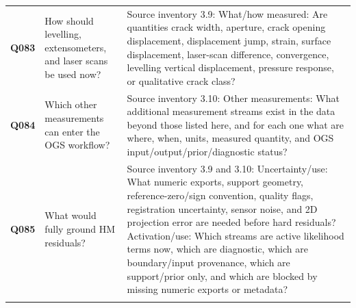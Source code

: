 \begin{longtable}{@{}L{0.10\textwidth} L{0.30\textwidth} L{0.52\textwidth}@{}}
\addlinespace[0.22em]
\textbf{Q083} & How should levelling, extensometers, and laser scans be used now? & Source inventory 3.9: What/how measured: Are quantities crack width, aperture, crack opening displacement, displacement jump, strain, surface displacement, laser-scan difference, convergence, levelling vertical displacement, pressure response, or qualitative crack class?\\
\addlinespace[0.22em]
\textbf{Q084} & Which other measurements can enter the OGS workflow? & Source inventory 3.10: Other measurements: What additional measurement streams exist in the data beyond those listed here, and for each one what are where, when, units, measured quantity, and OGS input/output/prior/diagnostic status?\\
\addlinespace[0.22em]
\textbf{Q085} & What would fully ground HM residuals? & Source inventory 3.9 and 3.10: Uncertainty/use: What numeric exports, support geometry, reference-zero/sign convention, quality flags, registration uncertainty, sensor noise, and 2D projection error are needed before hard residuals? Activation/use: Which streams are active likelihood terms now, which are diagnostic, which are boundary/input provenance, which are support/prior only, and which are blocked by missing numeric exports or metadata?\\
\addlinespace[0.22em]
\end{longtable}
\clearpage

